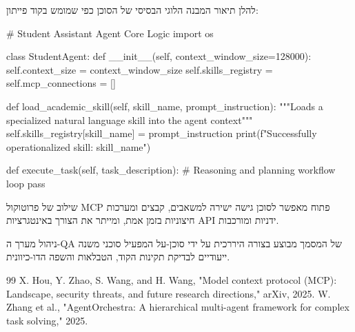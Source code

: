 \documentclass{hebrew-academic-template}
\begin{document}
להלן תיאור המבנה הלוגי הבסיסי של הסוכן כפי שמומש בקוד פייתון:

\begin{pythonbox}
# Student Assistant Agent Core Logic
import os

class StudentAgent:
    def __init__(self, context_window_size=128000):
        self.context_size = context_window_size
        self.skills_registry = {}
        self.mcp_connections = []

    def load_academic_skill(self, skill_name, prompt_instruction):
        """Loads a specialized natural language skill into the agent context"""
        self.skills_registry[skill_name] = prompt_instruction
        print(f"Successfully operationalized skill: {skill_name}")

    def execute_task(self, task_description):
        # Reasoning and planning workflow loop
        pass
\end{pythonbox}

שילוב של פרוטוקול MCP פתוח מאפשר לסוכן גישה ישירה למשאבים, קבצים ומערכות חיצוניות בזמן אמת, ומייתר את הצורך באינטגרציות API ידניות ומורכבות.

ניהול מערך ה-QA של המסמך מבוצע בצורה היררכית על ידי סוכן-על  המפעיל סוכני משנה ייעודיים לבדיקת תקינות הקוד, הטבלאות והשפה הדו-כיוונית.

\newpage
\begin{thebibliography}{99}
 X. Hou, Y. Zhao, S. Wang, and H. Wang, "Model context protocol (MCP): Landscape, security threats, and future research directions," arXiv, 2025.
 W. Zhang et al., "AgentOrchestra: A hierarchical multi-agent framework for complex task solving," 2025.
\end{thebibliography}
\end{document}
